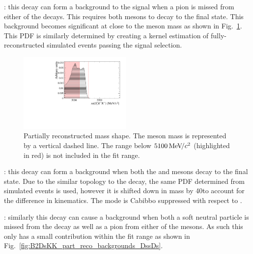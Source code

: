 \begin{description}
\item \decay{\Bsb}{\Dsp\Dsm}: this decay can form a background to the signal when a pion is missed from either of the \Dsp decays. This requires both \Dsp mesons to decay to the \decay{\Dsp}{\Kp\Km\pip} final state. 
This background becomes significant at close to the \Bp meson mass as shown in Fig.~\ref{fig:B2DsKK_part_reco_backgrounds_DsDs}. 
This PDF is similarly determined by creating a kernel estimation of fully-reconstructed simulated events passing the signal selection.  
\end{description}

\begin{figure}[!h]
    \centering
    \includegraphics[width=0.49\textwidth]{figs/B2DsKK/Bs2DsDs_4800_5900_Shape.pdf}
    \caption{Partially reconstructed \decay{\Bsb}{\Dsp\Dsm} mass shape. The \Bp meson mass is represented by a vertical dashed line. The range below $5100{\mathrm{\,Me\kern -0.1em V\!/}c^2}$ (highlighted in red) is not included in the fit range.}
    \label{fig:B2DsKK_part_reco_backgrounds_DsDs}   
\end{figure}

\begin{description}
\item \decay{\Bzb}{\Dsp\Dm}: this decay can form a background when both the \Dsp and \Dm mesons decay to the \Kpm\Kmp\pipm final state. Due to the similar topology to the \decay{\Bsb}{\Dsp\Dsm} decay, the same PDF determined from simulated events is used, however it is shifted down in mass by 40\mevcc to account for the difference in kinematics. The mode \decay{\Dp}{\Kp\Km\pip} is Cabibbo suppressed with respect to \decay{\Dsp}{\Kp\Km\pip}.

\item \decay{\Bsb}{\Dssp\Dsm}: similarly this decay can cause a background when both a soft neutral particle is missed from the  decay as well as a pion from either of the \Dsp mesons. As such this only has a small contribution within the fit range as shown in Fig.~\ref{fig:B2DsKK_part_reco_backgrounds_DssDs}. 
\end{description}

